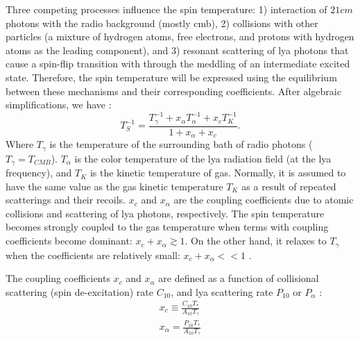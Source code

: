 \documentclass[12pt, TexShade, letterpaper]{report}
\begin{document}
Three competing processes influence the spin temperature: 1) interaction of $21cm$ photons with the radio background (mostly \gls{cmb}), 2) collisions with other particles (a mixture of hydrogen atoms, free electrons, and protons with hydrogen atoms as the leading component), and 3) resonant scattering of \gls{lya} photons that cause a spin-flip transition with through the meddling of an intermediate excited state. Therefore, the spin temperature will be expressed using the equilibrium between these mechanisms and their corresponding coefficients. After algebraic simplifications, we have \cite{low_frequency,21century}:
\begin{equation}
    T^{-1}_S = \frac{T^{-1}_\gamma + x_\alpha T^{-1}_\alpha + x_c T^{-1}_K}{1 + x_\alpha + x_c}.
\end{equation}
Where $T_\gamma$ is the temperature of the surrounding bath of radio photons ($T_\gamma = T_{CMB}$). $T_\alpha$ is the color temperature of the \gls{lya} radiation field (at the \gls{lya} frequency), and $T_K$ is the kinetic temperature of gas. Normally, it is assumed to have the same value as the gas kinetic temperature $T_K$ as a result of repeated scatterings and their recoils. $x_c$ and $x_\alpha$ are the coupling coefficients due to atomic collisions and scattering of \gls{lya} photons, respectively. The spin temperature becomes strongly coupled to the gas temperature when terms with coupling coefficients become dominant: $x_c + x_\alpha \gtrsim 1$. On the other hand, it relaxes to $T_\gamma$ when the coefficients are relatively small: $x_c + x_\alpha << 1$ \cite{21century, low_frequency}. \par
The coupling coefficients $x_c$ and $x_\alpha$ are defined as a function of collisional scattering (spin de-excitation) rate $C_{10}$, and \gls{lya} scattering rate $P_{10}$ or $P_\alpha$ \cite{explore_cosmic_dawn, low_frequency}:
\begin{gather}
    x_c \equiv \frac{C_{10}T_*}{A_{10}T_\gamma}\\
    x_\alpha = \frac{P_{10} T_*}{A_{10}T_\gamma} \label{eq:x_a}
\end{gather}
\end{document}
